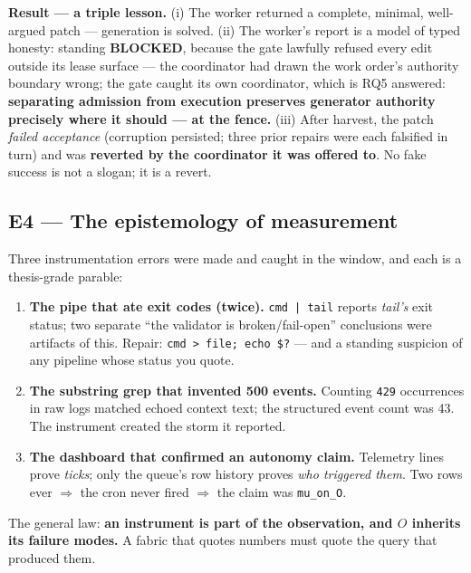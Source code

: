 \documentclass[11pt,a4paper]{article}
\theoremstyle{remark}
\newcommand{\term}[1]{\texttt{#1}}
\begin{document}
\textbf{Result --- a triple lesson.} (i) The worker returned a complete, minimal, well-argued patch --- generation is solved. (ii) The worker's report is a model of typed honesty: standing \textbf{BLOCKED}, because the gate lawfully refused every edit outside its lease surface --- the coordinator had drawn the work order's authority boundary wrong; the gate caught its own coordinator, which is RQ5 answered: \textbf{separating admission from execution preserves generator authority precisely where it should --- at the fence.} (iii) After harvest, the patch \emph{failed acceptance} (corruption persisted; three prior repairs were each falsified in turn) and was \textbf{reverted by the coordinator it was offered to}. No fake success is not a slogan; it is a revert.

\subsection{E4 --- The epistemology of measurement}
Three instrumentation errors were made and caught in the window, and each is a thesis-grade parable:
\begin{enumerate}
\item \textbf{The pipe that ate exit codes (twice).} \term{cmd | tail} reports \emph{tail's} exit status; two separate ``the validator is broken/fail-open'' conclusions were artifacts of this. Repair: \term{cmd > file; echo \$?} --- and a standing suspicion of any pipeline whose status you quote.
\item \textbf{The substring grep that invented 500 events.} Counting \term{429} occurrences in raw logs matched echoed context text; the structured event count was 43. The instrument created the storm it reported.
\item \textbf{The dashboard that confirmed an autonomy claim.} Telemetry lines prove \emph{ticks}; only the queue's row history proves \emph{who triggered them}. Two rows ever $\Rightarrow$ the cron never fired $\Rightarrow$ the claim was \term{mu\_on\_O}.
\end{enumerate}
The general law: \textbf{an instrument is part of the observation, and $O$ inherits its failure modes.} A fabric that quotes numbers must quote the query that produced them.
\end{document}
